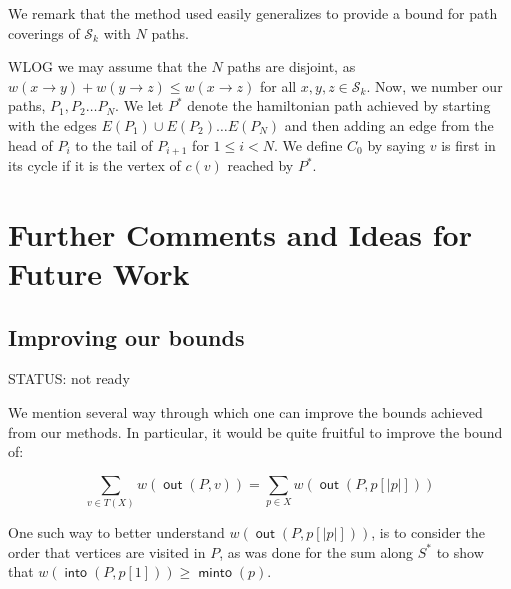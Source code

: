 \documentclass{article}
\theoremstyle{definition}
\DeclareMathOperator{\minto}{\bm{\mathsf{minto}}}
\DeclareMathOperator{\out}{\bm{\mathsf{out}}}
\DeclareMathOperator{\into}{\bm{\mathsf{into}}}
\newcommand{\hide}[1]{}
\begin{document}
We remark that the method used easily generalizes to provide a bound for path coverings of $\mathcal{S}_k$ with $N$ paths. 

WLOG we may assume that the $N$ paths are disjoint, as $w(x\to y)+w(y\to z) \le w(x \to z)$ for all $x,y,z \in \mathcal{S}_k$. Now, we number our paths, $P_1,P_2\dots P_N$. We let $P^*$ denote the hamiltonian path achieved by starting with the edges $E(P_1) \cup E(P_2) \dots E(P_N)$ and then adding an edge from the head of $P_i$ to the tail of $P_{i+1}$ for $1\le i< N$. We define $C_0$ by saying $v$ is first in its cycle if it is the vertex of $c(v)$ reached by $P^*$.


\hide{
$\dagger$ We outline how we reached these conclusions. First, we by considered optimizing the intervals $t(k(k-1)(k-2)-k)+k < \ell \leq (t+1)(k(k-1)(k-2)-k)+k$, $t \geq 1$, according to our lower bound of $i$, and concluded that taking $\ell = (t+1)(k(k-1)(k-2)-k)+k$ was best. 

We then simply considered the interval up to $k(k-1)(k-2)$, finding that taking $\ell = k(k-1)(k-2)$ was best. Comparing to the optimal $\ell$'s in across intervals, we concluded that they all gave the same value. 

Finally, since our bound is tight along the interval up to $k(k-1)(k-2)$, we are able to remark equality for these two bounds. (meaning with the current reductions, this bound is tight, and cannot be improved)}

\section{Further Comments and Ideas for Future Work}

\subsection{Improving our bounds} \label{imp}

STATUS: not ready

We mention several way through which one can improve the bounds achieved from our methods. In particular, it would be quite fruitful to improve the bound of:

\[ \sum_{v\in T(X)} w(\out(P,v)) = \sum_{p \in X} w(\out(P,p[|p|])) \]

One such way to better understand $w(\out(P,p[|p|]))$, is to consider the order that vertices are visited in $P$, as was done for the sum along $S^*$ to show that $w(\into(P,p[1])) \geq \minto(p)$. 
\end{document}
